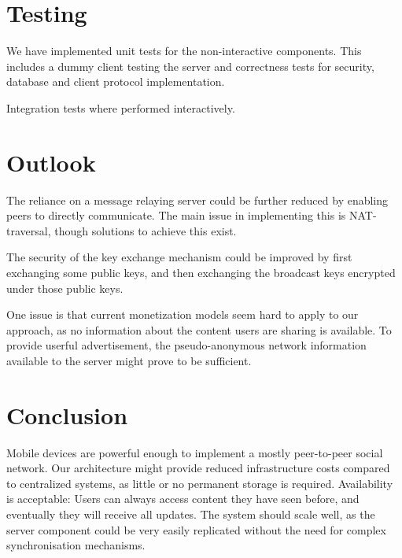 \documentclass{report}
\begin{document}
\section{Testing}

We have implemented unit tests for the non-interactive components. This includes a dummy client testing the server and correctness tests for security, database and client protocol implementation.

Integration tests where performed interactively.

\section{Outlook}

The reliance on a message relaying server could be further reduced by enabling peers to directly communicate. The main issue in implementing this is NAT-traversal, though solutions to achieve this exist.

The security of the key exchange mechanism could be improved by first exchanging some public keys, and then exchanging the broadcast keys encrypted under those public keys.

One issue is that current monetization models seem hard to apply to our approach, as no information about the content users are sharing is available. To provide userful advertisement, the pseudo-anonymous network information available to the server might prove to be sufficient. 

\section{Conclusion}

Mobile devices are powerful enough to implement a mostly peer-to-peer social network. Our architecture might provide reduced infrastructure costs compared to centralized systems, as little or no permanent storage is required. Availability is acceptable: Users can always access content they have seen before, and eventually they will receive all updates. 
The system should scale well, as the server component could be very easily replicated without the need for complex synchronisation mechanisms.






\end{document}
